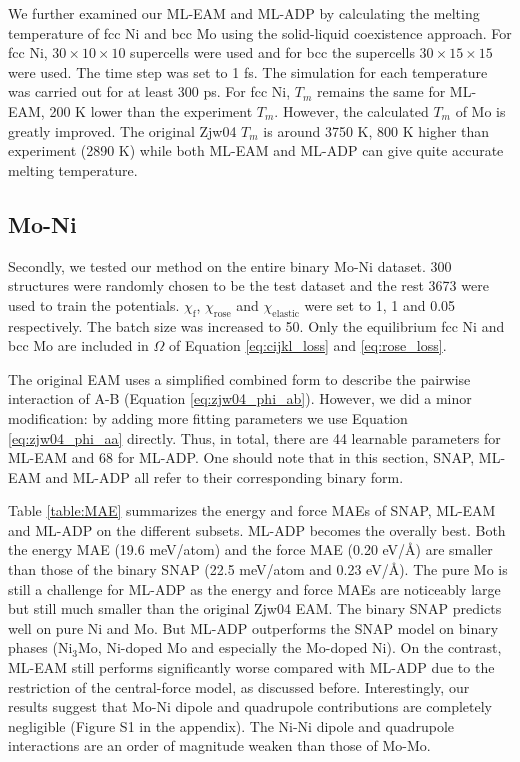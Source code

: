 \documentclass[prb,reprint,superscriptaddress]{revtex4-2}
\begin{document}
We further examined our ML-EAM and ML-ADP by calculating the melting temperature
of fcc Ni and bcc Mo using the solid-liquid coexistence approach. For fcc Ni, 
$30 \times 10 \times 10$ supercells were used and for bcc the supercells 
$30 \times 15 \times 15$ were used. The time step was set to 1 fs. The 
simulation for each temperature was carried out for at least 300 ps. 
For fcc Ni, $T_{m}$ remains the 
same for ML-EAM, 200 K lower than the experiment $T_m$. However, the calculated 
$T_{m}$ of Mo is greatly improved. The original Zjw04 $T_{m}$ is around 3750 K, 
800 K higher than experiment (2890 K) while both ML-EAM and ML-ADP can give 
quite accurate melting temperature. 

% 
%
\subsection{Mo-Ni}
\label{sec:alloy}

Secondly, we tested our method on the entire binary Mo-Ni dataset. 300 
structures were randomly chosen to be the test dataset and the rest 3673 
were used to train the potentials. $\chi_{\mathrm{f}}$, $\chi_{\mathrm{rose}}$ 
and $\chi_{\mathrm{elastic}}$ were set to 1, 1 and 0.05 respectively. The batch 
size was increased to 50. Only the equilibrium fcc Ni and bcc Mo are included in 
$\Omega$ of Equation \ref{eq:cijkl_loss} and \ref{eq:rose_loss}.

The original EAM uses a simplified combined form to describe the pairwise 
interaction of A-B (Equation \ref{eq:zjw04_phi_ab}). However, we did a minor 
modification: by adding more fitting parameters we use Equation 
\ref{eq:zjw04_phi_aa} directly. Thus, in total, there are 44 learnable 
parameters for ML-EAM and 68 for ML-ADP. One should note that in this section, 
SNAP, ML-EAM and ML-ADP all refer to their corresponding binary form.

Table \ref{table:MAE} summarizes the energy and force MAEs of SNAP, ML-EAM and 
ML-ADP on the different subsets. ML-ADP becomes the overally best. 
Both the energy MAE (19.6 meV/atom) and the force MAE (0.20 eV/\AA) are smaller 
than those of the binary SNAP (22.5 meV/atom and 0.23 eV/\AA). 
The pure Mo is still a challenge for ML-ADP as the energy and force MAEs are 
noticeably large but still much smaller than the original Zjw04 EAM. The binary 
SNAP predicts well on pure Ni and Mo. But ML-ADP outperforms the SNAP model on 
binary phases (Ni$_3$Mo, Ni-doped Mo and especially the Mo-doped Ni).
On the contrast, ML-EAM still performs significantly worse compared with ML-ADP 
due to the restriction of the central-force model, as discussed before. 
Interestingly, our results suggest that Mo-Ni dipole and quadrupole 
contributions are completely negligible (Figure S1 in the appendix). The Ni-Ni 
dipole and quadrupole interactions are an order of magnitude weaken than those 
of Mo-Mo. 
\end{document}
